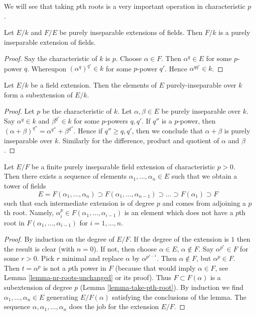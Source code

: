 \noindent
We will see that taking $p$th roots is a very important operation in
characteristic $p$.

\begin{lemma}
\label{lemma-purely-inseparable-permanence}
Let $E/k$ and $F/E$ be purely inseparable extensions of fields. Then $F/k$
is a purely inseparable extension of fields.
\end{lemma}

\begin{proof}
Say the characteristic of $k$ is $p$. Choose $\alpha \in F$. Then
$\alpha^q \in E$ for some $p$-power $q$. Whereupon $(\alpha^q)^{q'} \in k$
for some $p$-power $q'$. Hence $\alpha^{qq'} \in k$.
\end{proof}

\begin{lemma}
\label{lemma-purely-inseparable-elements}
Let $E/k$ be a field extension. Then the elements of $E$ purely-inseparable
over $k$ form a subextension of $E/k$.
\end{lemma}

\begin{proof}
Let $p$ be the characteristic of $k$.
Let $\alpha, \beta \in E$ be purely inseparable over $k$. Say
$\alpha^q \in k$ and $\beta^{q'} \in k$ for some $p$-powers $q, q'$.
If $q''$ is a $p$-power, then
$(\alpha + \beta)^{q''} = \alpha^{q''} + \beta^{q''}$.
Hence if $q'' \geq q, q'$, then we conclude that $\alpha + \beta$
is purely inseparable over $k$. Similarly for the difference,
product and quotient of $\alpha$ and $\beta$.
\end{proof}

\begin{lemma}
\label{lemma-finite-purely-inseparable}
Let $E/F$ be a finite purely inseparable field extension of
characteristic $p > 0$. Then there exists a sequence of elements
$\alpha_1, \ldots, \alpha_n \in E$ such that we obtain a tower
of fields
$$
E = F(\alpha_1, \ldots, \alpha_n) \supset
F(\alpha_1, \ldots, \alpha_{n - 1}) \supset
\ldots
\supset F(\alpha_1) \supset F
$$
such that each intermediate extension is of degree $p$ and comes
from adjoining a $p$th root. Namely,
$\alpha_i^p \in F(\alpha_1, \ldots, \alpha_{i - 1})$
is an element which does not have a $p$th root in
$F(\alpha_1, \ldots, \alpha_{i - 1})$ for $i = 1, \ldots, n$.
\end{lemma}

\begin{proof}
By induction on the degree of $E/F$. If the degree of the extension is $1$
then the result is clear (with $n = 0$). If not, then choose
$\alpha \in E$, $\alpha \not \in F$. Say $\alpha^{p^r} \in F$ for some
$r > 0$. Pick $r$ minimal and replace $\alpha$ by $\alpha^{p^{r - 1}}$.
Then $\alpha \not \in F$, but $\alpha^p \in F$. Then $t = \alpha^p$ is not
a $p$th power in $F$ (because that would imply $\alpha \in F$, see
Lemma \ref{lemma-nr-roots-unchanged} or its proof).
Thus $F \subset F(\alpha)$ is a subextension of degree $p$
(Lemma \ref{lemma-take-pth-root}). By induction we find
$\alpha_1, \ldots, \alpha_n \in E$ generating $E/F(\alpha)$
satisfying the conclusions of the lemma.
The sequence $\alpha, \alpha_1, \ldots, \alpha_n$ does the job
for the extension $E/F$.
\end{proof}

